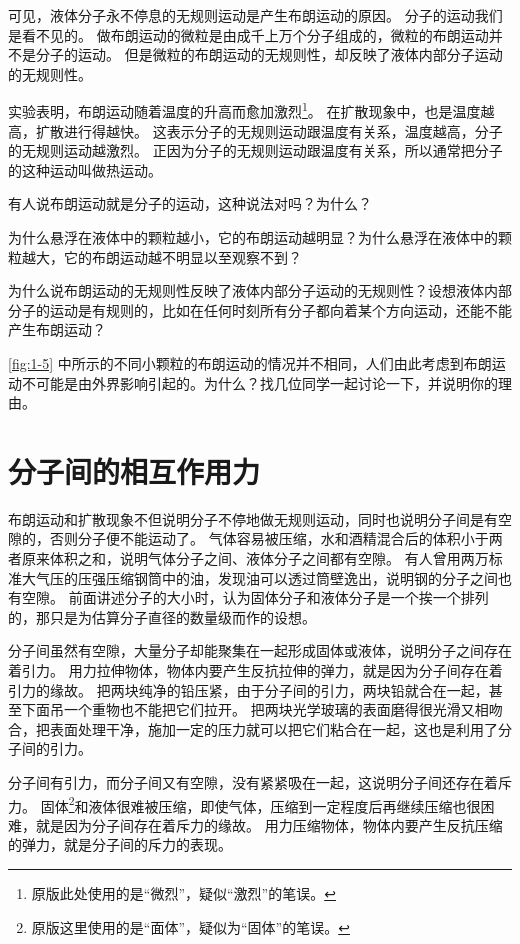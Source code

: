 可见，液体分子永不停息的无规则运动是产生布朗运动的原因。
分子的运动我们是看不见的。
做布朗运动的微粒是由成千上万个分子组成的，微粒的布朗运动并不是分子的运动。
但是微粒的布朗运动的无规则性，却反映了液体内部分子运动的无规则性。

实验表明，布朗运动随着温度的升高而愈加激烈\footnote{原版此处使用的是“微烈”，疑似“激烈”的笔误。}。
在扩散现象中，也是温度越高，扩散进行得越快。
这表示分子的无规则运动跟温度有关系，温度越高，分子的无规则运动越激烈。
正因为分子的无规则运动跟温度有关系，所以通常把分子的这种运动叫做热运动。

\begin{Practice}
\begin{question}
  \item 有人说布朗运动就是分子的运动，这种说法对吗？为什么？
  \item 为什么悬浮在液体中的颗粒越小，它的布朗运动越明显？为什么悬浮在液体中的颗粒越大，它的布朗运动越不明显以至观察不到？
  \item 为什么说布朗运动的无规则性反映了液体内部分子运动的无规则性？设想液体内部分子的运动是有规则的，比如在任何时刻所有分子都向着某个方向运动，还能不能产生布朗运动？
  \item \cref{fig:1-5} 中所示的不同小颗粒的布朗运动的情况并不相同，人们由此考虑到布朗运动不可能是由外界影响引起的。为什么？找几位同学一起讨论一下，并说明你的理由。
\end{question}
\end{Practice}

\section{分子间的相互作用力}
布朗运动和扩散现象不但说明分子不停地做无规则运动，同时也说明分子间是有空隙的，否则分子便不能运动了。
气体容易被压缩，水和酒精混合后的体积小于两者原来体积之和，说明气体分子之间、液体分子之间都有空隙。
有人曾用两万标准大气压的压强压缩钢筒中的油，发现油可以透过筒壁逸出，说明钢的分子之间也有空隙。
前面讲述分子的大小时，认为固体分子和液体分子是一个挨一个排列的，那只是为估算分子直径的数量级而作的设想。

分子间虽然有空隙，大量分子却能聚集在一起形成固体或液体，说明分子之间存在着引力。
用力拉伸物体，物体内要产生反抗拉伸的弹力，就是因为分子间存在着引力的缘故。
把两块纯净的铅压紧，由于分子间的引力，两块铅就合在一起，甚至下面吊一个重物也不能把它们拉开。
把两块光学玻璃的表面磨得很光滑又相吻合，把表面处理干净，施加一定的压力就可以把它们粘合在一起，这也是利用了分子间的引力。

分子间有引力，而分子间又有空隙，没有紧紧吸在一起，这说明分子间还存在着斥力。
固体\footnote{原版这里使用的是“面体”，疑似为“固体”的笔误。}和液体很难被压缩，即使气体，压缩到一定程度后再继续压缩也很困难，就是因为分子间存在着斥力的缘故。
用力压缩物体，物体内要产生反抗压缩的弹力，就是分子间的斥力的表现。

